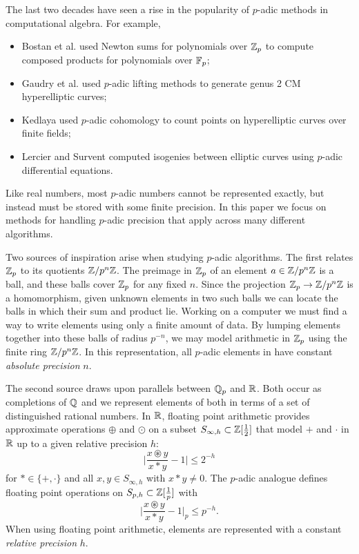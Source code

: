 \documentclass{lms}
\begin{document}
The last two decades have seen a rise in the popularity of $p$-adic methods in
computational algebra.  For example,
\begin{itemize}
\item Bostan et al. \cite{Bostan} used Newton sums for polynomials over $\mathbb Z_p$ to compute composed products for polynomials over $\mathbb{F}_p$;
\item Gaudry et al. \cite{Gaudry} used $p$-adic lifting methods to generate genus 2 CM hyperelliptic curves;
\item Kedlaya \cite{Kedlaya} used $p$-adic cohomology to count points on hyperelliptic curves over finite fields;
\item Lercier and Survent \cite{Lercier} computed isogenies between elliptic curves using $p$-adic differential equations.
\end{itemize}
Like real numbers, most $p$-adic numbers cannot be represented exactly, but instead must be
stored with some finite precision.  In this paper we focus on methods for handling $p$-adic precision
that apply across many different algorithms.

Two sources of inspiration arise when studying $p$-adic algorithms.
The first relates $\mathbb Z_p$ to its quotients $\mathbb Z/p^n\mathbb Z$.  The preimage in
$\mathbb Z_p$ of an element $a \in \mathbb Z / p^n \mathbb Z$ is a ball, and these balls cover
$\mathbb Z_p$ for any fixed $n$.  Since the projection $\mathbb Z_p \to \mathbb Z/p^n\mathbb Z$ is a
homomorphism, given unknown elements in two such balls we can
locate the balls in which their sum and product lie.  Working on a computer
we must find a way to write elements using only a finite amount of data.
By lumping elements together into these balls of radius $p^{-n}$, we may
model arithmetic in $\mathbb Z_p$ using the finite ring $\mathbb Z / p^n \mathbb Z$.  In this representation,
all $p$-adic elements in have constant \emph{absolute precision} $n$.

The second source draws upon parallels between $\mathbb Q_p$ and $\mathbb R$.  Both
occur as completions of $\mathbb Q$ and we represent elements of both in terms
of a set of distinguished rational numbers.
In $\mathbb R$, floating point arithmetic provides approximate operations $\oplus$ and $\odot$ on a
subset $S_{\infty,h} \subset \mathbb Z[\frac12]$ that model $+$ and $\cdot$ in $\mathbb R$ up to a given relative precision $h$:
\[
\lvert \frac{x \circledast y}{x \ast y} - 1 \rvert \le 2^{-h}
\]
for $\ast \in \{+, \cdot\}$ and all $x, y \in S_{\infty,h}$ with $x \ast y \ne 0$.  The $p$-adic analogue
defines floating point operations on $S_{p,h} \subset \mathbb Z[\frac1p]$ with
\[
\lvert \frac{x \circledast y}{x \ast y} - 1 \rvert_p \le p^{-h}.
\]
When using floating point arithmetic, elements are represented with a constant \emph{relative precision} $h$.
\end{document}
